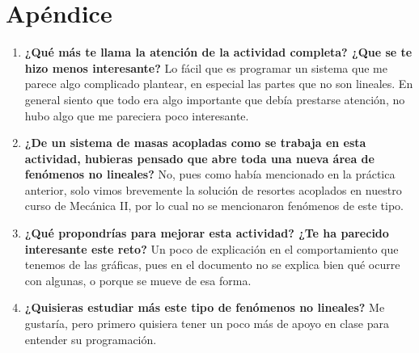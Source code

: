 \documentclass{article}
\begin{document}
\section{Apéndice}
\begin{enumerate}
\item \textbf{¿Qué más te llama la atención de la actividad completa? ¿Que se te hizo menos interesante?} Lo fácil que es programar un sistema que me parece algo complicado plantear, en especial las partes que no son lineales. En general siento que todo era algo importante que debía prestarse atención, no hubo algo que me pareciera poco interesante.

\item \textbf{¿De un sistema de masas acopladas como se trabaja en esta actividad, hubieras pensado que abre toda una nueva área de fenómenos no lineales?} No, pues como había mencionado en la práctica anterior, solo vimos brevemente la solución de resortes acoplados en nuestro curso de Mecánica II, por lo cual no se mencionaron fenómenos de este tipo.

\item \textbf{¿Qué propondrías para mejorar esta actividad? ¿Te ha parecido interesante este reto?} Un poco de explicación en el comportamiento que tenemos de las gráficas, pues en el documento no se explica bien qué ocurre con algunas, o porque se mueve de esa forma.

\item \textbf{¿Quisieras estudiar más este tipo de fenómenos no lineales?} Me gustaría, pero primero quisiera tener un poco más de apoyo en clase para entender su programación.

\end{enumerate}
\end{document}
